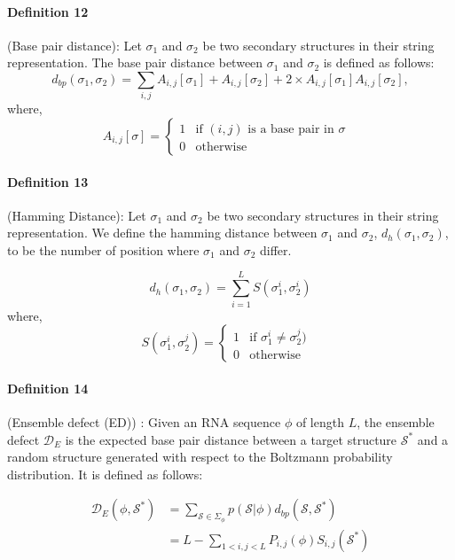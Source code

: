 \paragraph{\textbf{Definition 12}} (Base pair distance):  Let $\sigma_1$ and $\sigma_2$ be two secondary structures in their string representation.  The base pair distance between $\sigma_1$ and $\sigma_2$ is defined as follows: 
\begin{equation}
d_{bp}(\sigma_1, \sigma_2 )= \sum_{i,j} A_{i,j}[\sigma_1] + A_{i,j}[\sigma_2] + 2\times A_{i,j}[\sigma_1] A_{i,j}[\sigma_2],
\end{equation}
where, 
$$
A_{i,j}[\sigma] =
\begin{cases}
1 & \text{if $(i,j)$ is a base pair in $\sigma$ } \\
0 & \text{otherwise}
\end{cases}
$$

\paragraph{\textbf{Definition 13}} (Hamming Distance):  Let $\sigma_1$ and $\sigma_2$ be two secondary structures in their string representation. We define the hamming distance between $\sigma_1$ and $\sigma_2$, $d_h(\sigma_1, \sigma_2)$, to be the number of position where $\sigma_1$ and $\sigma_2$ differ.  

\begin{equation}
	\label{eq:hamming}
	d_h(\sigma_1, \sigma_2) = \sum_{i=1}^{L}{S(\sigma_1^i, \sigma_2^i)}
\end{equation}
where, 
$$
S(\sigma_1^i, \sigma_2^j) =
\begin{cases}
1 & \text{if $\sigma_1^i \neq \sigma_2^j)$ } \\
0 & \text{otherwise}
\end{cases}
$$
\paragraph{\textbf{Definition 14}} (Ensemble defect (ED)) \citep{zadeh2011nucleic}: Given an RNA sequence $\phi$ of length $L$, the ensemble defect $\mathcal{D}_E$ is the expected base pair distance between a target structure $\mathcal{S}^*$  and a random structure generated with respect to the Boltzmann probability distribution. It is defined as follows: 

\begin{equation}
\label{ed}
\begin{split}
\mathcal{D}_E(\phi, \mathcal{S}^*) 
&= \sum_{\mathcal{S} \in \Sigma_{\phi}}{p(\mathcal{S}|\phi)d_{bp}(\mathcal{S},\mathcal{S}^*)}\\
&= L - \sum_{1<i,j<L} P_{i,j}(\phi)S_{i,j}(\mathcal{S}^*)
\end{split}
\end{equation}


